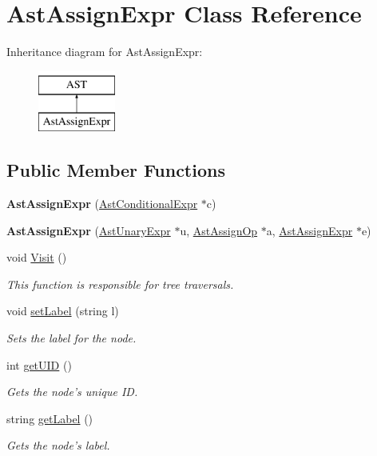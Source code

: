 \hypertarget{classAstAssignExpr}{\section{Ast\-Assign\-Expr Class Reference}
\label{classAstAssignExpr}
}
Inheritance diagram for Ast\-Assign\-Expr\-:\begin{figure}[H]
\begin{center}
\leavevmode
\includegraphics[height=2.000000cm]{classAstAssignExpr}
\end{center}
\end{figure}
\subsection*{Public Member Functions}
\begin{DoxyCompactItemize}
\item 
\hypertarget{classAstAssignExpr_adcf8fd9d2e80a579e8fad5ae28c79211}{{\bfseries Ast\-Assign\-Expr} (\hyperlink{classAstConditionalExpr}{Ast\-Conditional\-Expr} $\ast$c)}\label{classAstAssignExpr_adcf8fd9d2e80a579e8fad5ae28c79211}

\item 
\hypertarget{classAstAssignExpr_abbbd7c531a5c6fdecde141f46699f375}{{\bfseries Ast\-Assign\-Expr} (\hyperlink{classAstUnaryExpr}{Ast\-Unary\-Expr} $\ast$u, \hyperlink{classAstAssignOp}{Ast\-Assign\-Op} $\ast$a, \hyperlink{classAstAssignExpr}{Ast\-Assign\-Expr} $\ast$e)}\label{classAstAssignExpr_abbbd7c531a5c6fdecde141f46699f375}

\item 
void \hyperlink{classAstAssignExpr_a7e86da39b9d65e34a16314c0927b78d9}{Visit} ()
\begin{DoxyCompactList}\small\item\em This function is responsible for tree traversals. \end{DoxyCompactList}\item 
void \hyperlink{classAST_a71d680856e95ff89f55d5311a552eba6}{set\-Label} (string l)
\begin{DoxyCompactList}\small\item\em Sets the label for the node. \end{DoxyCompactList}\item 
int \hyperlink{classAST_ab7a5b1d9f1c2de0d98deb356f724a42c}{get\-U\-I\-D} ()
\begin{DoxyCompactList}\small\item\em Gets the node's unique I\-D. \end{DoxyCompactList}\item 
string \hyperlink{classAST_aee029be902fffc927d16ccb03eb922ad}{get\-Label} ()
\begin{DoxyCompactList}\small\item\em Gets the node's label. \end{DoxyCompactList}\end{DoxyCompactItemize}
